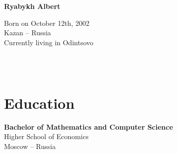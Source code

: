 \documentclass[a4paper,10pt]{article}
\begin{document}
\thispagestyle{empty}

\begin{adjustbox}{valign=t}
\begin{minipage}{0.3\textwidth} %
\begin{center}

\MySkip 	%

{\LARGE \bfseries Ryabykh Albert}

\MySkip 	%

Born on October 12th, 2002\\
Kazan -- Russia\\
Currently living in Odintsovo\\

\MySkip 	%

\textcolor{ColorTwo}{\faEnvelopeO} 
 \\
 \\

\end{center}

\vfill

\section*{Education}
	\begin{description}
	\raggedright
	\item [\normalfont \textcolor{ColorOne}{Sep 2020 --- Jul 2024}] \textbf{Bachelor of Mathematics and Computer Science} \\
	Higher School of Economics\\
	Moscow -- Russia
\end{description}

\vfill
\end{minipage}
\end{adjustbox}
%
%
\end{document}
